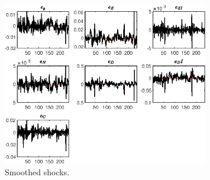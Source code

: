  
\begin{figure}[H]
\centering 
\includegraphics[width=0.80\textwidth]{BRS_growth_util/graphs/BRS_growth_util_SmoothedShocks1}
\caption{Smoothed shocks.}\label{Fig:SmoothedShocks:1}
\end{figure}


